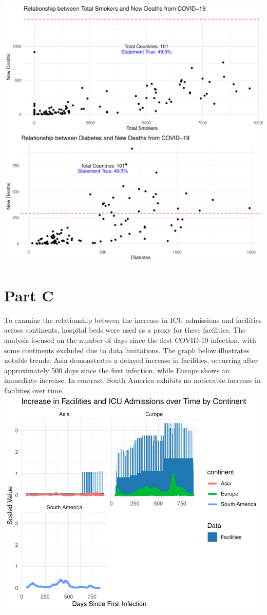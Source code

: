 \documentclass[11pt,preprint, authoryear]{elsarticle}
\numberwithin{equation}{section}
\numberwithin{figure}{section}
\numberwithin{table}{section}
\begin{document}
\includegraphics[angle=90]{Question1_files/figure-latex/unnamed-chunk-3-1}

\hypertarget{part-c}{%
\section{Part C}\label{part-c}}

To examine the relationship between the increase in ICU admissions and
facilities across continents, hospital beds were used as a proxy for
these facilities. The analysis focused on the number of days since the
first COVID-19 infection, with some continents excluded due to data
limitations. The graph below illustrates notable trends: Asia
demonstrates a delayed increase in facilities, occurring after
approximately 500 days since the first infection, while Europe shows an
immediate increase. In contrast, South America exhibits no noticeable
increase in facilities over time.
\includegraphics{Question1_files/figure-latex/unnamed-chunk-4-1.pdf}
\end{document}
